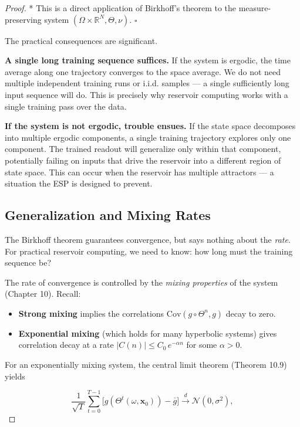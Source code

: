 \begin{proof}
* This is a direct application of Birkhoff's theorem to the measure-preserving system $(\Omega \times \mathbb{R}^N, \Theta, \nu)$. $\square$

The practical consequences are significant.

\textbf{A single long training sequence suffices.} If the system is ergodic, the time average along one trajectory converges to the space average. We do not need multiple independent training runs or i.i.d. samples --- a single sufficiently long input sequence will do. This is precisely why reservoir computing works with a single training pass over the data.

\textbf{If the system is not ergodic, trouble ensues.} If the state space decomposes into multiple ergodic components, a single training trajectory explores only one component. The trained readout will generalize only within that component, potentially failing on inputs that drive the reservoir into a different region of state space. This can occur when the reservoir has multiple attractors --- a situation the ESP is designed to prevent.

\subsection{Generalization and Mixing Rates}\label{sec:16.2.3}

The Birkhoff theorem guarantees convergence, but says nothing about the \textit{rate}. For practical reservoir computing, we need to know: how long must the training sequence be?

The rate of convergence is controlled by the \textit{mixing properties} of the system (Chapter 10). Recall:

\begin{itemize}[nosep]
  \item \textbf{Strong mixing} implies the correlations $\text{Cov}(g \circ \Theta^n, g)$ decay to zero.
  \item \textbf{Exponential mixing} (which holds for many hyperbolic systems) gives correlation decay at a rate $|C(n)| \leq C_0 \, e^{-\alpha n}$ for some $\alpha > 0$.
\end{itemize}

For an exponentially mixing system, the central limit theorem (Theorem 10.9) yields

\[
\frac{1}{\sqrt{T}} \sum_{t=0}^{T-1} \bigl[g(\Theta^t(\omega, \mathbf{x}_0)) - \bar{g}\bigr] \xrightarrow{d} \mathcal{N}(0, \sigma^2),
\]


\end{proof}
